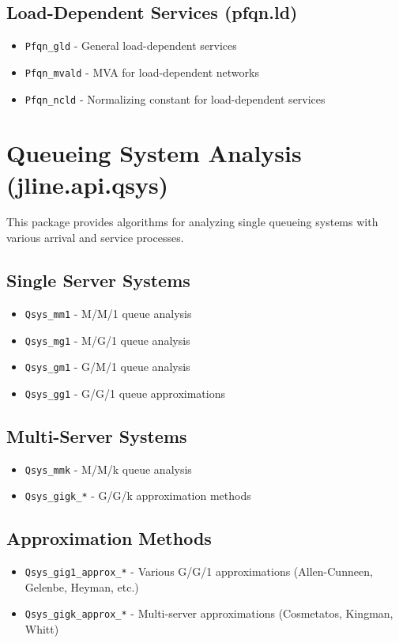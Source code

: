 \subsection{Load-Dependent Services (pfqn.ld)}
\begin{itemize}
\item \texttt{Pfqn\_gld} - General load-dependent services
\item \texttt{Pfqn\_mvald} - MVA for load-dependent networks
\item \texttt{Pfqn\_ncld} - Normalizing constant for load-dependent services
\end{itemize}

\section{Queueing System Analysis (jline.api.qsys)}

This package provides algorithms for analyzing single queueing systems with various arrival and service processes.

\subsection{Single Server Systems}
\begin{itemize}
\item \texttt{Qsys\_mm1} - M/M/1 queue analysis
\item \texttt{Qsys\_mg1} - M/G/1 queue analysis  
\item \texttt{Qsys\_gm1} - G/M/1 queue analysis
\item \texttt{Qsys\_gg1} - G/G/1 queue approximations
\end{itemize}

\subsection{Multi-Server Systems}
\begin{itemize}
\item \texttt{Qsys\_mmk} - M/M/k queue analysis
\item \texttt{Qsys\_gigk\_*} - G/G/k approximation methods
\end{itemize}

\subsection{Approximation Methods}
\begin{itemize}
\item \texttt{Qsys\_gig1\_approx\_*} - Various G/G/1 approximations (Allen-Cunneen, Gelenbe, Heyman, etc.)
\item \texttt{Qsys\_gigk\_approx\_*} - Multi-server approximations (Cosmetatos, Kingman, Whitt)
\end{itemize}

